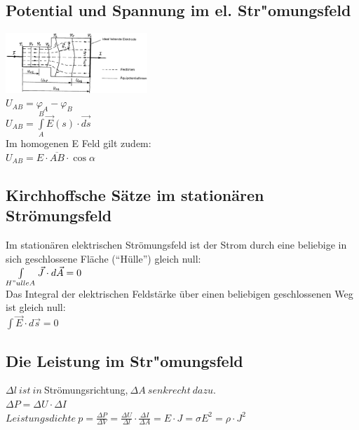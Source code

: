 \subsection{Potential und Spannung im el. Str"omungsfeld}
\begin{multicols}{2}
\includegraphics[width=0.4\textwidth]{pics/stroemungsfeld/feldlinien}\\
$ U_{AB} = \varphi_A - \varphi_B $\\
$ U_{AB} = \int\limits_{A}^B \vec E (s) \cdot  \vec{ds} $ \\
Im homogenen E Feld gilt zudem: \\
$ U_{AB} = E \cdot \overline{AB} \cdot \cos\alpha $ \\
\end{multicols}

\subsection{Kirchhoffsche Sätze im stationären Strömungsfeld}
Im stationären elektrischen Strömungsfeld ist der Strom durch eine beliebige in sich geschlossene Fläche ("`Hülle"') gleich null:\\
$ \int\limits_{H"ulle A} \vec J \cdot d \vec A = 0 $\\
Das Integral der elektrischen Feldstärke über einen beliebigen geschlossenen Weg ist gleich null:\\
$ \int \vec E \cdot d \vec s = 0 $\\

\subsection{Die Leistung im Str"omungsfeld}
$ \Delta{l} \ ist\ in\ $Strömungsrichtung,$\ \Delta{A} \ senkrecht\ dazu.$\\
$ \Delta P = \Delta U \cdot \Delta I $\\
$ Leistungsdichte\ p = \frac{\Delta P}{\Delta V} = \frac{\Delta U }{\Delta l} \cdot \frac{\Delta I}{\Delta A} = E \cdot J = \sigma E^2 = \rho \cdot J^2 $\\

